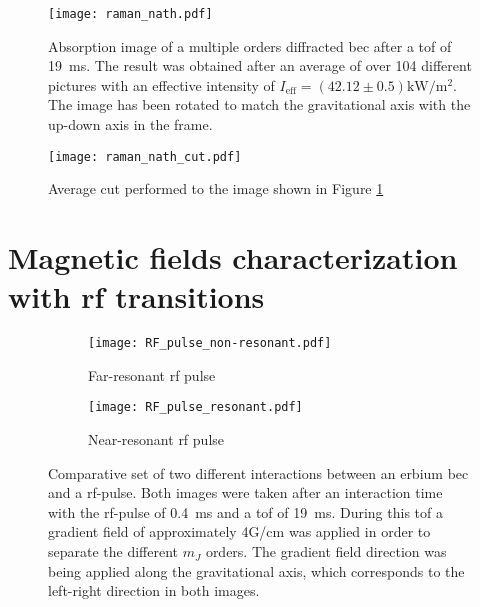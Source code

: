 \begin{figure}[!htbp]\centering
	\texttt{[image: raman\_nath.pdf]}
	\caption[Absorption image of a multiple orders diffracted \ac{bec} after a \ac{tof} of \SI{19}{\milli\second}]{Absorption image of a multiple orders diffracted \ac{bec} after a \ac{tof} of \SI{19}{\milli\second}. The result was obtained after an average of over 104 different pictures with an effective intensity of $I_\text{eff} = (42.12 \pm 0.5)\si{\kilo\watt\per\meter\squared}$. The image has been rotated to match the gravitational axis with the up-down axis in the frame.}\label{fig:raman_nath_cut}\label{fig:raman_nath}
\end{figure}

\begin{figure}[!htbp]\centering
	\texttt{[image: raman\_nath\_cut.pdf]}
	\caption[Average cut performed to the image shown in Figure \ref{fig:raman_nath}]{Average cut performed to the image shown in Figure \ref{fig:raman_nath}}
\end{figure}

\pagebreak

\section{Magnetic fields characterization with \acs{rf} transitions}


\begin{figure}[!htbp]
	\centering
	\begin{subfigure}{.5\textwidth}
		\centering
		\texttt{[image: RF\_pulse\_non-resonant.pdf]}
		\caption{Far-resonant \ac{rf} pulse}
		\label{fig:RF_pulse_non-resonant}
	\end{subfigure}%
	\begin{subfigure}{.5\textwidth}
		\centering
		\texttt{[image: RF\_pulse\_resonant.pdf]}
		\caption{Near-resonant \ac{rf} pulse}
		\label{fig:RF_pulse_resonant}
	\end{subfigure}
	\caption[Comparative set of two different interactions between an erbium \ac{bec} and a \ac{rf}-pulse.]{Comparative set of two different interactions between an erbium \ac{bec} and a \ac{rf}-pulse. Both images were taken after an interaction time with the \ac{rf}-pulse of \SI{0.4}{\milli\second} and a \ac{tof} of \SI{19}{\milli\second}. During this \acl{tof} a gradient field of approximately 4G/cm was applied in order to separate the different $m_J$ orders. The gradient field direction was being applied along the gravitational axis, which corresponds to the left-right direction in both images.}
	\label{fig:RF_pulse}
\end{figure}

